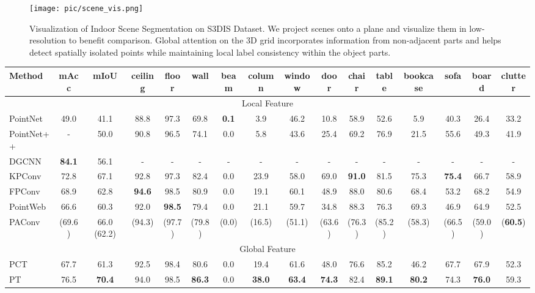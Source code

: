 \documentclass[sigconf]{acmart}
\begin{document}
\begin{figure*}[t]
  \centering
    \texttt{[image: pic/scene\_vis.png]}
  \caption{Visualization of Indoor Scene Segmentation on S3DIS\cite{armeni20163d} Dataset. We project scenes onto a plane and visualize them in low-resolution to benefit comparison.  Global attention on the 3D grid incorporates information from non-adjacent parts and helps detect spatially isolated points while maintaining local label consistency within the object parts. 
}
    \label{fig:scene_vis}
    \vspace{-0.0cm}
\end{figure*}
\begin{table*}[t]
\centering
\begin{adjustbox}{width=\textwidth}
	\begin{tabular}{l|cc|ccccccccccccc}
	\toprule
	   Method &mAcc &mIoU &ceiling &floor &wall &beam &column &window &door &chair &table &bookcase &sofa &board &clutter\\ \midrule
		\multicolumn{16}{c}{Local Feature} \\  \midrule PointNet\cite{qi2017pointnet} &49.0 &41.1 &88.8 &97.3 &69.8 &\textbf{0.1} &3.9 &46.2 &10.8 &58.9 &52.6 &5.9 &40.3 &26.4 &33.2\\
        PointNet++\cite{qi2017pointnet++} &- &50.0 &90.8 &96.5 &74.1 &0.0 &5.8 &43.6 &25.4 &69.2 &76.9 &21.5 &55.6 &49.3 &41.9\\
		DGCNN\cite{wang2019dynamic} &\textbf{84.1} &56.1 &- &- &- &- &- &- &- &- &- &- &- &- &-\\
		KPConv\cite{thomas2019kpconv} &72.8 &67.1 &92.8 &97.3 &82.4 &0.0 &23.9 &58.0 &69.0 &\textbf{91.0} &81.5 &75.3 &\textbf{75.4} &66.7 &58.9\\
		FPConv\cite{lin2020fpconv} &68.9 &62.8 &\textbf{94.6} &98.5 &80.9 &0.0 &19.1 &60.1 &48.9 &88.0 &80.6 &68.4 &53.2  &68.2 &54.9\\
	    PointWeb\cite{zhao2019pointweb} &66.6 &60.3 &92.0 &\textbf{98.5} &79.4 &0.0 &21.1 &59.7 &34.8 &88.3 &76.3  &69.3 &46.9  &64.9 &52.5\\
	    PAConv\cite{xu2021paconv}&(69.6) &66.0 (62.2) &(94.3)&(97.7)&(79.8)&(0.0)&(16.5)&(51.1)&(63.6)&(76.3)&(85.2)&(58.3)&(66.5)&(59.0)&(\textbf{60.5}) \\
	    \midrule
	    \multicolumn{16}{c}{Global Feature} \\  \midrule PCT\cite{guo2021pct} &67.7 &61.3 &92.5 &98.4 &80.6 &0.0 &19.4 &61.6 &48.0 &76.6 &85.2 &46.2 &67.7 &67.9 &52.3\\
	    PT\cite{zhao2021point} &76.5 &\textbf{70.4} &94.0 &98.5 &\textbf{86.3} &0.0 &\textbf{38.0} &\textbf{63.4} &\textbf{74.3} &82.4 &\textbf{89.1} &\textbf{80.2} &74.3 &\textbf{76.0} &59.3\\

\end{tabular}
\end{adjustbox}
\end{table*}
\end{document}
